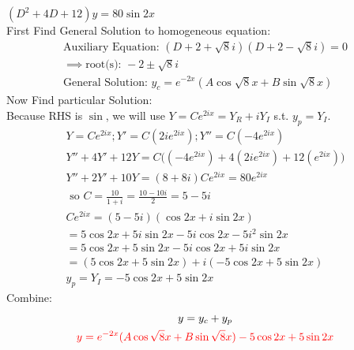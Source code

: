 \item [12.] $(D^2+4D+12)y=80\sin{2x}$\\[2mm]
First Find General Solution to homogeneous equation:
\begin{gather*}
    \text{Auxiliary Equation: } (D+2+\sqrt{8}i)(D+2-\sqrt{8}i)=0\\
    \implies \text{root(s): } -2 \pm \sqrt{8}i\\
    \text{General Solution: } y_c=e^{-2x}(A\cos{\sqrt{8}x}+B\sin{\sqrt{8}x})
\end{gather*}
Now Find particular Solution:\\
Because RHS is $\sin$, we will use $Y=Ce^{2ix}=Y_R+iY_I$ s.t. $y_p=Y_I$. 
\begin{gather*}
    Y=Ce^{2ix}; Y'=C(2ie^{2ix});Y''=C(-4e^{2ix})\\
    Y''+4Y'+12Y = C
    \big(
    (-4e^{2ix})
    +4(2ie^{2ix})
    +12(e^{2ix})
    \big)\\
    Y''+2Y'+10Y=(8+8i)Ce^{2ix}=80e^{2ix}\\
    \text{ so } C=\frac{10}{1+i}=\frac{10-10i}{2}=5-5i\\
    Ce^{2ix}=(5-5i)(\cos{2x}+i\sin{2x})\\
    = 5\cos{2x}+5i\sin{2x}-5i\cos{2x}-5i^2\sin{2x}\\
    = 5\cos{2x}+5\sin{2x}-5i\cos{2x}+5i\sin{2x}\\
    = (5\cos{2x}+5\sin{2x})+i(-5\cos{2x}+5\sin{2x})\\
    y_p = Y_I = -5\cos{2x}+5\sin{2x}
\end{gather*}
Combine:
\begin{gather*}
    y=y_c+y_p\\
    \textcolor{red}{y = e^{-2x}(A\cos{\sqrt{8}x}+B\sin{\sqrt{8}x})-5\cos{2x}+5\sin{2x}}
\end{gather*}